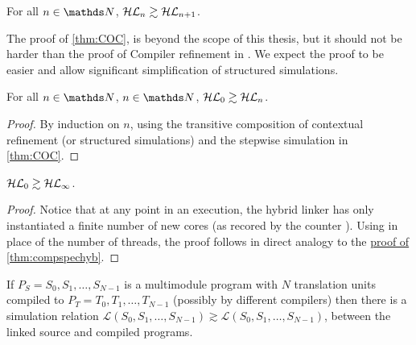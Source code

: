 \begin{conjecture}\label{thm:COC} For all  $n\in \nat$,  $\mathcal{HL}_{n} \gtrsim \mathcal{HL}_{n+1}$. \end{conjecture}

The proof of \cref{thm:COC}, is beyond the scope of this thesis, but it should not be harder than the proof of Compiler refinement in \cite{compcomp}. We expect the proof to be easier and allow significant simplification of structured simulations. 

\begin{lemma}\label{thm:manycores} For all  $n\in \nat$,  $n\in \nat$,  $\mathcal{HL}_{0} \gtrsim \mathcal{HL}_{n}$.\end{lemma}
\begin{proof} By induction on $n$, using the transitive composition of contextual refinement (or structured simulations) and the stepwise simulation in \cref{thm:COC}.
\end{proof}


\begin{theorem}\label{thm:allcores} $\mathcal{HL}_{0} \gtrsim \mathcal{HL}_{\infty}$. \end{theorem}
\begin{proof} Notice that at any point in an execution, the hybrid linker has only instantiated a finite number of new cores (as recored by the counter ). Using  in place of the number of threads, the proof follows in direct analogy to the \hyperlink{proof:compspechyb}{proof of \cref*{thm:compspechyb}}.
\end{proof}

\begin{corollary}\label{thm:sepcomp} 
If $P_S = S_0, S_1, \dots , S_{N-1}$ is a multimodule program with $N$ translation units compiled to $P_T = T_0, T_1, \dots , T_{N-1}$ 
(possibly by different compilers) then there is a simulation relation $ \mathcal{L} (S_0, S_1, \dots , S_{N-1}) \gtrsim \mathcal{L} (S_0, S_1, \dots , S_{N-1})$, between the linked source and compiled programs. \end{corollary}

